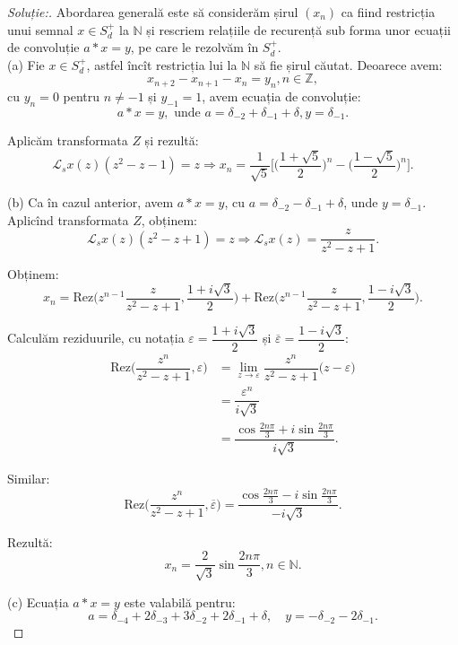 \documentclass[12pt,a4paper]{article}
\newcommand\Lap{\mathcal{L}}
\newcommand\Rez{\mathrm{Rez}}
\theoremstyle{dotless}
\theoremstyle{dotlessdr}
\newenvironment{solution}
{\begin{proof}[Soluție:\nopunct]}
  {\end{proof}}
\begin{document}
\begin{solution}
Abordarea generală este să considerăm șirul $(x_n)$ ca fiind restricția unui 
semnal $x \in S_d^+$ la $\mathbb{N}$ și rescriem relațiile de recurență sub 
forma unor ecuații de convoluție $a \ast x = y$, pe care le rezolvăm în $S_d^+$.\\

(a) Fie $x \in S_d^+$, astfel încît restricția lui la $\mathbb{N}$ să fie șirul 
căutat. Deoarece avem: 
\[
x_{n+2} - x_{n+1} - x_n = y_n, n \in \mathbb{Z},
\]
cu $y_n = 0$ pentru $n \neq -1$ și $y_{-1} = 1$, avem ecuația de convoluție: 
\[
a \ast x = y, \text{ unde } a 
= \delta_{-2} + \delta_{-1} + \delta, y = \delta_{-1}.
\]

Aplicăm transformata $Z$ și rezultă: 
\[
\Lap_s x(z) (z^2 - z - 1) = z \Longrightarrow x_n 
= \dfrac{1}{\sqrt{5}} \Big[ \Big( \dfrac{1 + \sqrt{5}}{2} \Big)^n - 
\Big( \dfrac{1 - \sqrt{5}}{2} \Big)^n \Big].
\]

(b) Ca în cazul anterior, avem $a \ast x = y$, cu 
$a = \delta_{-2} - \delta_{-1} + \delta$, unde $y = \delta_{-1}$. Aplicînd 
transformata $Z$, obținem: 
\[
\Lap_s x(z) (z^2 - z + 1) = z \Longrightarrow \Lap_s x(z) 
= \dfrac{z}{z^2 - z + 1}.
\]

Obținem:
\[
x_n = \Rez \Big( z^{n-1} \dfrac{z}{z^2 - z + 1}, 
\dfrac{1 + i \sqrt{3}}{2} \Big) + \Rez \Big( z^{n-1} \dfrac{z}{z^2 - z + 1}, 
\dfrac{1 - i \sqrt{3}}{2} \Big).
\]

Calculăm reziduurile, cu notația $\varepsilon = \dfrac{1 + i \sqrt{3}}{2}$ și 
$\overline{\varepsilon} = \dfrac{1 - i \sqrt{3}}{2}$:
\begin{align*}
\Rez \Big( \dfrac{z^n}{z^2 - z + 1}, \varepsilon \Big) 
&= \lim_{z \to \varepsilon} \dfrac{z^n}{z^2 - z + 1} 
\big( z - \varepsilon \big) \\
&= \dfrac{\varepsilon^n}{i \sqrt{3}} \\
&= \dfrac{\cos \frac{2 n \pi}{3} + i \sin \frac{2 n \pi}{3}}{i \sqrt{3}}.
\end{align*}

Similar: 
\[
\Rez \Big( \dfrac{z^n}{z^2 - z + 1}, \overline{\varepsilon} \Big) 
= \dfrac{\cos \frac{2n\pi}{3} - i \sin \frac{2 n \pi}{3}}{-i\sqrt{3}}.
\]

Rezultă: 
\[
x_n = \dfrac{2}{\sqrt{3}} \sin \dfrac{2n\pi}{3}, n \in \mathbb{N}.
\]

(c) Ecuația $a \ast x = y$ este valabilă pentru: 
\[
a = \delta_{-4} + 2 \delta_{-3} + 3 \delta_{-2} + 2 \delta_{-1} + \delta, 
\quad y = -\delta_{-2} - 2 \delta_{-1}.
\]


\end{solution}
\end{document}
